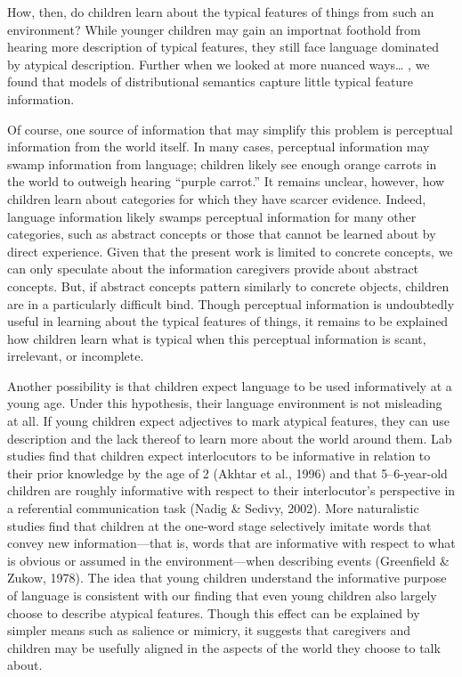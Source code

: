 \documentclass[10pt, letterpaper]{article}
\begin{document}
How, then, do children learn about the typical features of things from
such an environment? While younger children may gain an importnat
foothold from hearing more description of typical features, they still
face language dominated by atypical description. Further when we looked
at more nuanced ways\ldots{} , we found that models of distributional
semantics capture little typical feature information.

Of course, one source of information that may simplify this problem is
perceptual information from the world itself. In many cases, perceptual
information may swamp information from language; children likely see
enough orange carrots in the world to outweigh hearing ``purple
carrot.'' It remains unclear, however, how children learn about
categories for which they have scarcer evidence. Indeed, language
information likely swamps perceptual information for many other
categories, such as abstract concepts or those that cannot be learned
about by direct experience. Given that the present work is limited to
concrete concepts, we can only speculate about the information
caregivers provide about abstract concepts. But, if abstract concepts
pattern similarly to concrete objects, children are in a particularly
difficult bind. Though perceptual information is undoubtedly useful in
learning about the typical features of things, it remains to be
explained how children learn what is typical when this perceptual
information is scant, irrelevant, or incomplete.

Another possibility is that children expect language to be used
informatively at a young age. Under this hypothesis, their language
environment is not misleading at all. If young children expect
adjectives to mark atypical features, they can use description and the
lack thereof to learn more about the world around them. Lab studies find
that children expect interlocutors to be informative in relation to
their prior knowledge by the age of 2 (Akhtar et al., 1996) and that
5--6-year-old children are roughly informative with respect to their
interlocutor's perspective in a referential communication task (Nadig \&
Sedivy, 2002). More naturalistic studies find that children at the
one-word stage selectively imitate words that convey new
information---that is, words that are informative with respect to what
is obvious or assumed in the environment---when describing events
(Greenfield \& Zukow, 1978). The idea that young children understand the
informative purpose of language is consistent with our finding that even
young children also largely choose to describe atypical features. Though
this effect can be explained by simpler means such as salience or
mimicry, it suggests that caregivers and children may be usefully
aligned in the aspects of the world they choose to talk about.
\end{document}
